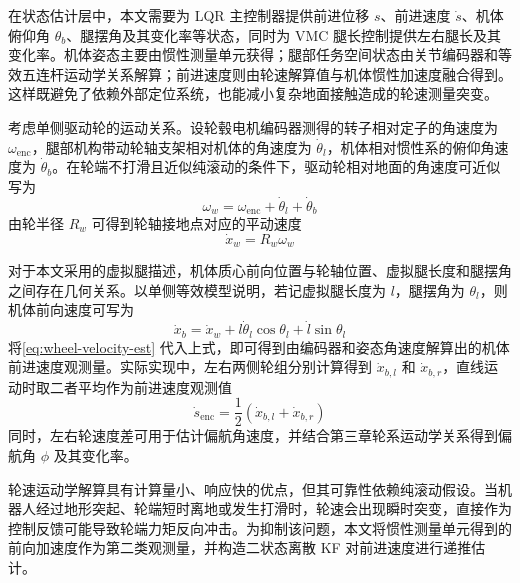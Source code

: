 在状态估计层中，本文需要为 LQR 主控制器提供前进位移 $s$、前进速度 $\dot{s}$、机体俯仰角 $\theta_b$、腿摆角及其变化率等状态，同时为 VMC 腿长控制提供左右腿长及其变化率。机体姿态主要由惯性测量单元获得；腿部任务空间状态由关节编码器和等效五连杆运动学关系解算；前进速度则由轮速解算值与机体惯性加速度融合得到。这样既避免了依赖外部定位系统，也能减小复杂地面接触造成的轮速测量突变。

考虑单侧驱动轮的运动关系。设轮毂电机编码器测得的转子相对定子的角速度为 $\omega_{\mathrm{enc}}$，腿部机构带动轮轴支架相对机体的角速度为 $\dot{\theta}_l$，机体相对惯性系的俯仰角速度为 $\dot{\theta}_b$。在轮端不打滑且近似纯滚动的条件下，驱动轮相对地面的角速度可近似写为
\begin{equation}
  \omega_w
  =
  \omega_{\mathrm{enc}}
  +
  \dot{\theta}_l
  +
  \dot{\theta}_b 
  \label{eq:wheel-ground-angular-velocity}
\end{equation}
由轮半径 $R_w$ 可得到轮轴接地点对应的平动速度
\begin{equation}
  \dot{x}_w = R_w \omega_w 
  \label{eq:wheel-velocity-est}
\end{equation}

对于本文采用的虚拟腿描述，机体质心前向位置与轮轴位置、虚拟腿长度和腿摆角之间存在几何关系。以单侧等效模型说明，若记虚拟腿长度为 $l$，腿摆角为 $\theta_l$，则机体前向速度可写为
\begin{equation}
  \dot{x}_b
  =
  \dot{x}_w
  +
  l \dot{\theta}_l \cos\theta_l
  +
  \dot{l}\sin\theta_l 
  \label{eq:body-velocity-kinematic}
\end{equation}
将\eqref{eq:wheel-velocity-est} 代入上式，即可得到由编码器和姿态角速度解算出的机体前进速度观测量。实际实现中，左右两侧轮组分别计算得到 $\dot{x}_{b,l}$ 和 $\dot{x}_{b,r}$，直线运动时取二者平均作为前进速度观测值
\begin{equation}
  \dot{s}_{\mathrm{enc}}
  =
  \frac{1}{2}
  \left(
    \dot{x}_{b,l}
    +
    \dot{x}_{b,r}
  \right)
  \label{eq:encoder-forward-velocity}
\end{equation}
同时，左右轮速度差可用于估计偏航角速度，并结合第三章轮系运动学关系得到偏航角 $\phi$ 及其变化率。

轮速运动学解算具有计算量小、响应快的优点，但其可靠性依赖纯滚动假设。当机器人经过地形突起、轮端短时离地或发生打滑时，轮速会出现瞬时突变，直接作为控制反馈可能导致轮端力矩反向冲击。为抑制该问题，本文将惯性测量单元得到的前向加速度作为第二类观测量，并构造二状态离散 KF 对前进速度进行递推估计。

